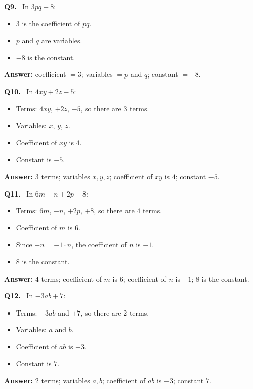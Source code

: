 \documentclass[12pt,a4paper]{article}
\newcommand{\solQ}[1]{\textbf{#1.}\ }
\newcommand{\ans}[1]{\par\noindent\textbf{Answer: }#1\par}
\begin{document}
\begin{solbox}
\solQ{Q9} In \(3pq-8\):
\begin{itemize}
  \item \(3\) is the coefficient of \(pq\).
  \item \(p\) and \(q\) are variables.
  \item \(-8\) is the constant.
\end{itemize}
\ans{coefficient \(=3\); variables \(=p\) and \(q\); constant \(=-8\).}
\end{solbox}

\begin{solbox}
\solQ{Q10} In \(4xy+2z-5\):
\begin{itemize}
  \item Terms: \(4xy\), \(+2z\), \(-5\), so there are \(3\) terms.
  \item Variables: \(x\), \(y\), \(z\).
  \item Coefficient of \(xy\) is \(4\).
  \item Constant is \(-5\).
\end{itemize}
\ans{3 terms; variables \(x,y,z\); coefficient of \(xy\) is \(4\); constant \(-5\).}
\end{solbox}

\begin{solbox}
\solQ{Q11} In \(6m-n+2p+8\):
\begin{itemize}
  \item Terms: \(6m\), \(-n\), \(+2p\), \(+8\), so there are \(4\) terms.
  \item Coefficient of \(m\) is \(6\).
  \item Since \(-n=-1\cdot n\), the coefficient of \(n\) is \(-1\).
  \item \(8\) is the constant.
\end{itemize}
\ans{4 terms; coefficient of \(m\) is \(6\); coefficient of \(n\) is \(-1\); \(8\) is the constant.}
\end{solbox}

\begin{solbox}
\solQ{Q12} In \(-3ab+7\):
\begin{itemize}
  \item Terms: \(-3ab\) and \(+7\), so there are \(2\) terms.
  \item Variables: \(a\) and \(b\).
  \item Coefficient of \(ab\) is \(-3\).
  \item Constant is \(7\).
\end{itemize}
\ans{2 terms; variables \(a,b\); coefficient of \(ab\) is \(-3\); constant \(7\).}
\end{solbox}
\end{document}
